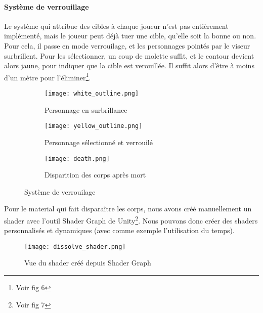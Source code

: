         
        \paragraph{Système de verrouillage}
            
            Le système qui attribue des cibles à chaque joueur n'est pas entièrement implémenté, mais le joueur peut déjà tuer une cible, qu'elle soit la bonne ou non.
            Pour cela, il passe en mode verrouilage, et les personnages pointés par le viseur surbrillent.
            Pour les sélectionner, un coup de molette suffit, et le contour devient alors jaune, pour indiquer que la cible est verouillée.
            Il suffit alors d'être à moins d'un mètre pour l'éliminer\footnote{Voir fig 6}.

            \begin{figure}[hbt!]
                \centering
                \begin{subfigure}[b]{0.3\textwidth}
                    \texttt{[image: white\_outline.png]} 
                    \caption{Personnage en surbrillance}
                \end{subfigure}
                \hspace{150pt}
                \begin{subfigure}[b]{0.3\textwidth}
                    \texttt{[image: yellow\_outline.png]} 
                    \caption{Personnage sélectionné et verrouilé}
                \end{subfigure}

                \begin{subfigure}[b]{0.3\textwidth}
                    \texttt{[image: death.png]} 
                    \caption{Disparition des corps après mort}
                \end{subfigure}
                \caption{Système de verrouilage}
            \end{figure}
			\FloatBarrier

            Pour le material qui fait disparaître les corps, nous avons créé manuellement un shader avec l'outil Shader Graph de Unity\footnote{Voir fig 7}.
            Nous pouvons donc créer des shaders personnalisés et dynamiques (avec comme exemple l'utilisation du temps).

            \begin{figure}[hbt!]
                \centering
                \texttt{[image: dissolve\_shader.png]}
                \caption{Vue du shader créé depuis Shader Graph}
            \end{figure}
			\FloatBarrier



